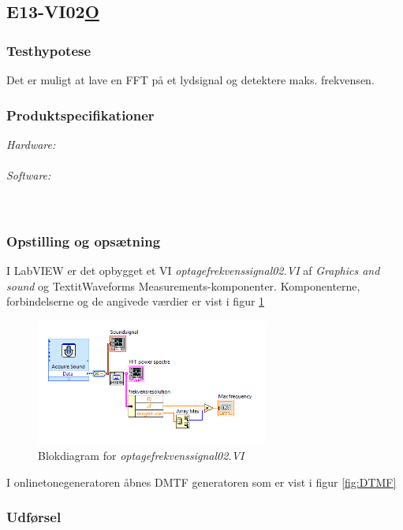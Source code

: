 \subsection{E13-VI02\underline{O}}
\subsubsection{Testhypotese}
Det er muligt at lave en FFT på et lydsignal og detektere maks. frekvensen.  

\subsubsection{Produktspecifikationer}
\textit{Hardware:}\\
		\PC\\
	
\textit{Software:}\\
		\labview\\
		\onlineg\\

\subsubsection{Opstilling og opsætning}

I LabVIEW er det opbygget et VI \textit{optagefrekvenssignal02.VI} af \textit{Graphics and sound} og Textit{Waveforms Measurements}-komponenter. Komponenterne, forbindelserne og de angivede værdier er vist i figur \ref{fig:VIo2}

\begin{figure}[htb]
			\centering
				\includegraphics[width=3in]{VI02o}
				\caption{Blokdiagram for \textit{optagefrekvenssignal02.VI}}	
				\label{fig:VIo2}
			\end{figure}
			
I onlinetonegeneratoren åbnes DMTF generatoren som er vist i figur \ref{fig:DTMF}  
			
\subsubsection{Udførsel}

